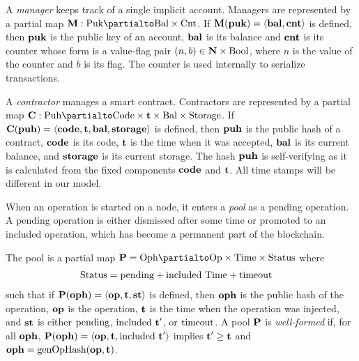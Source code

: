 \documentclass[runningheads]{llncs}
\begin{document}
A \emph{manager} keeps track of a single implicit account. Managers are
represented by a partial map $\MANAGERS : \TPUK \partialto \TBAL
\times \TCOU$. If $\textbf{M} (\textbf{puk}) = \langle\textbf{bal}, \textbf{cnt}\rangle$ is defined, then  $\textbf{puk}$ is the
public key of an account, $\textbf{bal}$ is its
balance and $\textbf{cnt}$ is its counter whose form is a value-flag pair
$(n,b) \in \textbf{N}\times\text{Bool}$, where $n$ is the value of the counter
and ${b}$ is its flag.   The counter is used internally to serialize transactions.

A \emph{contractor} manages a smart contract. Contractors are
represented by a partial map $\CONTRACTORS : \TPUH \partialto
\TCODE \times \TIME  \times \TBAL \times  \TSTORAGE$. If $\textbf{C} (\textbf{puh}) = \langle
\textbf{code}, \textbf{t}, \textbf{bal}, \textbf{storage} \rangle $ is defined, then $\textbf{puh}$ is the
public hash of a contract,
$\textbf{code}$ is its  code,
$\textbf{t}$ is the time when it was accepted,
$\textbf{bal}$ is its current balance,
and $\textbf{storage}$ is its current storage. The hash $\textbf{puh}$ is
self-verifying as it is calculated from the fixed components $\textbf{code}$
and $\textbf{t}$. All time stamps will be different in our model.

When an operation is started on a node, it enters a \emph{pool} as a
pending operation. A pending operation is either dismissed after some time or
promoted to an included operation, which has become a permanent part
of the blockchain.

The pool is a partial map $  \PENDING= \TOPH \partialto
\TOP\times \TTIME \times \TSTATUS$ where
\begin{align*}
  \text{Status}&= \text{pending} + \text{included}\ \text{Time} + \text{timeout}
\end{align*}
such that
if $\textbf{P}(\textbf{oph}) = \langle  \textbf{op}, \textbf{t}, \textbf{st}
\rangle $ is defined, then $\textbf{oph}$ is the public hash of the operation, $\textbf{op}$ is the operation, $\textbf{t}$ is the time when the
operation was injected, and $\textbf{st}$ is either $\text{pending}$,
$\text{included}\ \textbf{t}'$, or $\text{timeout}$.
A pool $\textbf{P}$ is \emph{well-formed} if, for all $\textbf{oph}$, $\textbf{P} (\textbf{oph}) =
\langle\textbf{op},\textbf{t}, \text{included}\ \textbf{t}'\rangle$ implies $\textbf{t}' \ge
\textbf{t}$ and $\textbf{oph} = \textup{genOpHash} (\textbf{op}, \textbf{t})$.
\end{document}
